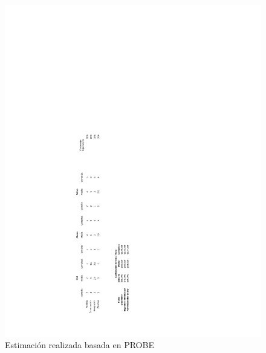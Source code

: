 \begin{figure}[htb]
	\centering
	\includegraphics[width=1.2\linewidth]{capitulo4/img/PROBE_2.png}
	\caption{Estimaci\'on realizada basada en PROBE}
\end{figure}

